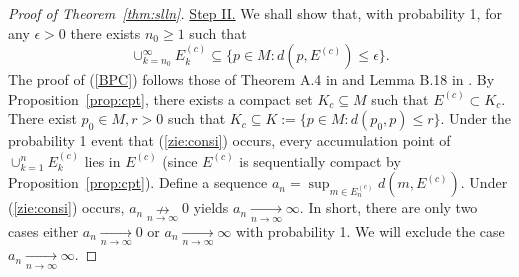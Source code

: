\documentclass[preprint]{imsart}
\theoremstyle{plain}
\theoremstyle{remark}
\begin{document}
\begin{appendix}
\begin{proof}[Proof of Theorem~\ref{thm:slln}]
\underline{Step II.} We shall show that, with probability 1, for any $\epsilon > 0$ there exists $n_0 \ge 1$ such that 
\begin{equation}\label{BPC}
\cup_{k=n_0}^{\infty} E^{(c)}_{k} \subseteq \{p \in M : d(p, E^{(c)}) \le \epsilon \}.
\end{equation}
The proof of (\ref{BPC}) follows those of Theorem A.4 in \cite{huckemann2011intrinsic} and Lemma B.18 in \cite{jung2025averaging}. By Proposition~\ref{prop:cpt}, there exists a compact set $K_{c} \subseteq M$ such that $E^{(c)} \subset K_{c}$. There exist $p_0 \in M, r > 0$ such that $K_{c} \subseteq K:=\{p \in M : d(p_0, p) \le r \}$. Under the probability 1 event that (\ref{zie:consi}) occurs, every accumulation point of $\cup_{k=1}^{n} E^{(c)}_{k}$ lies in $E^{(c)}$ (since $E^{(c)}$ is sequentially compact by Proposition~\ref{prop:cpt}). Define a sequence $a_{n}=\sup_{m \in E^{(c)}_{n}} d(m, E^{(c)})$. Under (\ref{zie:consi}) occurs, $a_{n} \underset{n \rightarrow \infty}{\nrightarrow} 0$ yields $a_{n} \underset{n \rightarrow \infty}{\rightarrow} \infty$. In short, there are only two cases either $a_{n} \underset{n \rightarrow \infty}{\rightarrow} 0$ or $a_{n} \underset{n \rightarrow \infty}{\rightarrow} \infty$ with probability 1. We will exclude the case $a_{n} \underset{n \rightarrow \infty}{\rightarrow} \infty$.


\end{proof}
\end{appendix}
\end{document}
